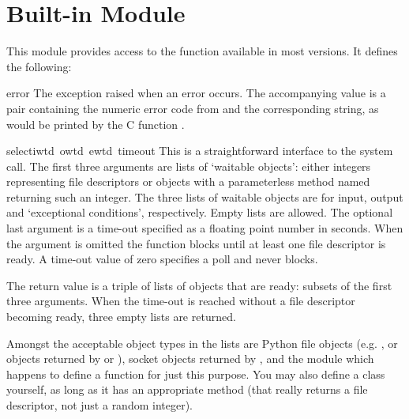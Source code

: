 \section{Built-in Module }

This module provides access to the function  available in
most \UNIX{} versions.  It defines the following:

\renewcommand{\indexsubitem}{(in module select)}
\begin{excdesc}{error}
The exception raised when an error occurs.  The accompanying value is
a pair containing the numeric error code from  and the
corresponding string, as would be printed by the C function
.
\end{excdesc}

\begin{funcdesc}{select}{iwtd\, owtd\, ewtd\, timeout}
This is a straightforward interface to the \UNIX{} 
system call.  The first three arguments are lists of `waitable
objects': either integers representing \UNIX{} file descriptors or
objects with a parameterless method named  returning
such an integer.  The three lists of waitable objects are for input,
output and `exceptional conditions', respectively.  Empty lists are
allowed.  The optional last argument is a time-out specified as a
floating point number in seconds.  When the  argument
is omitted the function blocks until at least one file descriptor is
ready.  A time-out value of zero specifies a poll and never blocks.

The return value is a triple of lists of objects that are ready:
subsets of the first three arguments.  When the time-out is reached
without a file descriptor becoming ready, three empty lists are
returned.

Amongst the acceptable object types in the lists are Python file
objects (e.g. , or objects returned by 
or ), socket objects returned by
, and the module  which happens to
define a function  for just this purpose.  You may
also define a  class yourself, as long as it has an
appropriate  method (that really returns a \UNIX{} file
descriptor, not just a random integer).
\end{funcdesc}
